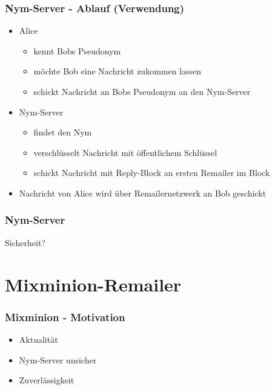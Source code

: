 \documentclass{beamer}
\begin{document}
\begin{frame}
	\frametitle{Nym-Server - Ablauf (Verwendung)}

	\begin{itemize}
		\item Alice 
		\begin{itemize}
			\item kennt Bobs Pseudonym
			\item möchte Bob eine Nachricht zukommen lassen
			\item schickt Nachricht an Bobs Pseudonym an den Nym-Server
		\end{itemize}

		\pause

		\item Nym-Server
		\begin{itemize}
			\item findet den Nym
			\item verschlüsselt Nachricht mit öffentlichem Schlüssel
			\item schickt Nachricht mit Reply-Block an ersten Remailer im Block
		\end{itemize}

		\item Nachricht von Alice wird über Remailernetzwerk an Bob geschickt
	\end{itemize}
\end{frame}

\begin{frame}
	\frametitle{Nym-Server}
	\centering
	Sicherheit?
\end{frame}

\section{Mixminion-Remailer}

\begin{frame}
	\frametitle{Mixminion - Motivation}
	
	\begin{itemize}
		\item Aktualität
		\item Nym-Server unsicher
		\item Zuverlässigkeit
	\end{itemize}
\end{frame}
\end{document}
